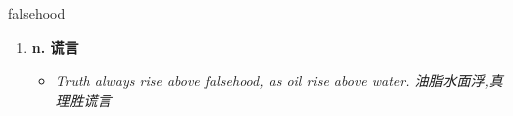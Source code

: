 
\begin{frame}
{\huge falsehood}
\begin{center}
\begin{enumerate}\Large
  \item \textbf{n. 谎言}
  \begin{itemize}
    \item \em{\Large{Truth always rise above falsehood, as oil rise above water. 油脂水面浮,真理胜谎言}}
  \end{itemize}
\end{enumerate}
\end{center}
\end{frame}
